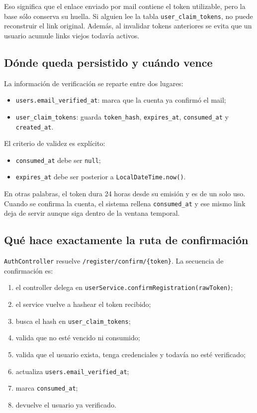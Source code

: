 \documentclass[11pt,a4paper]{report}
\newcommand{\code}[1]{\nolinkurl{#1}}
\begin{document}
Eso significa que el enlace enviado por mail contiene el token utilizable, pero la base s\'olo conserva su huella. Si alguien lee la tabla \code{user\_claim\_tokens}, no puede reconstruir el link original. Adem\'as, al invalidar tokens anteriores se evita que un usuario acumule links viejos todav\'ia activos.

\subsection{D\'onde queda persistido y cu\'ando vence}

La informaci\'on de verificaci\'on se reparte entre dos lugares:

\begin{itemize}
  \item \code{users.email\_verified\_at}: marca que la cuenta ya confirm\'o el mail;
  \item \code{user\_claim\_tokens}: guarda \code{token\_hash}, \code{expires\_at}, \code{consumed\_at} y \code{created\_at}.
\end{itemize}

El criterio de validez es expl\'icito:

\begin{itemize}
  \item \code{consumed\_at} debe ser \code{null};
  \item \code{expires\_at} debe ser posterior a \code{LocalDateTime.now()}.
\end{itemize}

En otras palabras, el token dura 24 horas desde su emisi\'on y es de un solo uso. Cuando se confirma la cuenta, el sistema rellena \code{consumed\_at} y ese mismo link deja de servir aunque siga dentro de la ventana temporal.

\subsection{Qu\'e hace exactamente la ruta de confirmaci\'on}

\code{AuthController} resuelve \code{/register/confirm/\{token\}}. La secuencia de confirmaci\'on es:

\begin{enumerate}
  \item el controller delega en \code{userService.confirmRegistration(rawToken)};
  \item el service vuelve a hashear el token recibido;
  \item busca el hash en \code{user\_claim\_tokens};
  \item valida que no est\'e vencido ni consumido;
  \item valida que el usuario exista, tenga credenciales y todav\'ia no est\'e verificado;
  \item actualiza \code{users.email\_verified\_at};
  \item marca \code{consumed\_at};
  \item devuelve el usuario ya verificado.
\end{enumerate}
\end{document}
